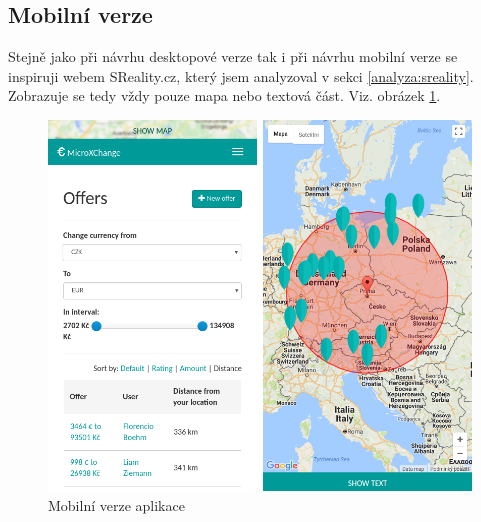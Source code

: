 \subsection{Mobilní verze}
Stejně jako při návrhu desktopové verze tak i při návrhu mobilní verze se inspiruji webem SReality.cz, který jsem analyzoval v sekci \ref{analyza:sreality}. Zobrazuje se tedy vždy pouze mapa nebo textová část. Viz. obrázek \ref{fig:tur:homepage-mobile}.

\begin{figure}[h]
    \centering
    \includegraphics[width=1.0\textwidth]{media/tur/homepage-mobile.png}
    \caption{Mobilní verze aplikace}
    \label{fig:tur:homepage-mobile}
\end{figure}
